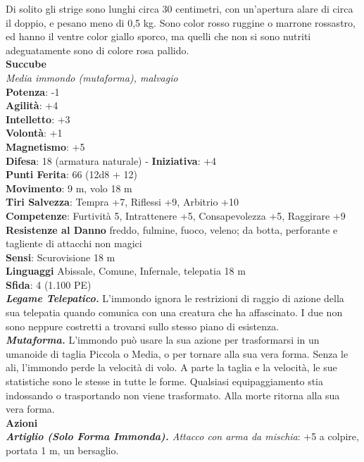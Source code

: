 \begin{multicols}{2}
Di solito gli strige sono lunghi circa 30 centimetri, con un'apertura alare di circa il doppio, e pesano meno di 0,5 kg. Sono color rosso ruggine o marrone rossastro, ed hanno il ventre color giallo sporco, ma quelli che non si sono nutriti adeguatamente sono di colore rosa pallido.\\


\medskip\textbf{Succube}\\
\emph{Media immondo (mutaforma), malvagio}\\
\textbf{Potenza}: -1\\
\textbf{Agilità}: +4\\
\textbf{Intelletto}: +3\\
\textbf{Volontà}: +1\\
\textbf{Magnetismo}: +5\\
\textbf{Difesa}: 18 (armatura naturale) - \textbf{Iniziativa}: +4\\
\textbf{Punti Ferita}: 66 (12d8 + 12)\\
\textbf{Movimento}: 9 m, volo 18 m\\
\textbf{Tiri Salvezza}: Tempra +7, Riflessi +9, Arbitrio +10\\
\textbf{Competenze}: Furtività 5, Intrattenere +5, Consapevolezza +5, Raggirare +9\\
\textbf{Resistenze al Danno} freddo, fulmine, fuoco, veleno; da botta, perforante e tagliente di attacchi non magici\\
\textbf{Sensi}: Scurovisione 18 m\\
\textbf{Linguaggi} Abissale, Comune, Infernale, telepatia 18 m \\
\textbf{Sfida}: 4 (1.100 PE)\smallskip\\
\emph{\textbf{Legame Telepatico.}} L'immondo ignora le restrizioni di raggio di azione della sua telepatia quando comunica con una creatura che ha affascinato. I due non sono neppure costretti a trovarsi sullo stesso piano di esistenza.\\
\emph{\textbf{Mutaforma.}} L'immondo può usare la sua azione per trasformarsi in un umanoide di taglia Piccola o Media, o per tornare alla sua vera forma. Senza le ali, l'immondo perde la velocità di volo. A parte la taglia e la velocità, le sue statistiche sono le stesse in tutte le forme. Qualsiasi equipaggiamento stia indossando o trasportando non viene trasformato. Alla morte ritorna alla sua vera forma. \\
\smallskip\textbf{Azioni}\\
\emph{\textbf{Artiglio (Solo Forma Immonda).} Attacco con arma da mischia}: +5 a colpire, portata 1 m, un bersaglio.\\

\end{multicols}
